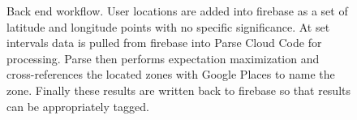 \begin{figure}
\caption{Back end workflow.  User locations are added into firebase as a set of latitude and longitude points with no specific significance.  At set intervals data is pulled from firebase into Parse Cloud Code for processing.  Parse then performs expectation maximization and cross-references the located zones with Google Places to name the zone.  Finally these results are written back to firebase so that results can be appropriately tagged.}
\label{backendWorkflow}
\end{figure}

